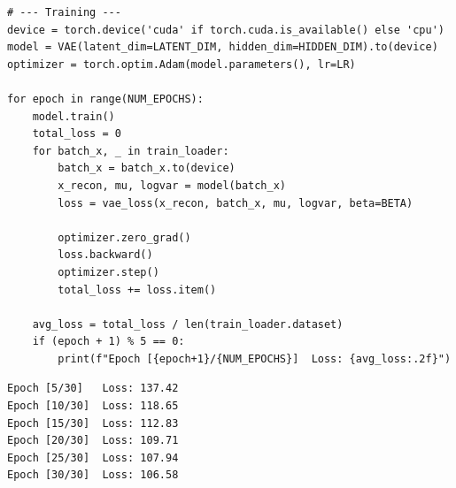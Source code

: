 \begin{codeblock}[title=\textbf{Complete VAE with training and visualization}]
\begin{verbatim}
# --- Training ---
device = torch.device('cuda' if torch.cuda.is_available() else 'cpu')
model = VAE(latent_dim=LATENT_DIM, hidden_dim=HIDDEN_DIM).to(device)
optimizer = torch.optim.Adam(model.parameters(), lr=LR)

for epoch in range(NUM_EPOCHS):
    model.train()
    total_loss = 0
    for batch_x, _ in train_loader:
        batch_x = batch_x.to(device)
        x_recon, mu, logvar = model(batch_x)
        loss = vae_loss(x_recon, batch_x, mu, logvar, beta=BETA)

        optimizer.zero_grad()
        loss.backward()
        optimizer.step()
        total_loss += loss.item()

    avg_loss = total_loss / len(train_loader.dataset)
    if (epoch + 1) % 5 == 0:
        print(f"Epoch [{epoch+1}/{NUM_EPOCHS}]  Loss: {avg_loss:.2f}")
\end{verbatim}
\end{codeblock}

\begin{codeoutput}
\begin{verbatim}
Epoch [5/30]   Loss: 137.42
Epoch [10/30]  Loss: 118.65
Epoch [15/30]  Loss: 112.83
Epoch [20/30]  Loss: 109.71
Epoch [25/30]  Loss: 107.94
Epoch [30/30]  Loss: 106.58
\end{verbatim}
\end{codeoutput}

